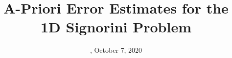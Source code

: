 

                    

\newcommand{\Rplus}{\protect\hspace{-.1em}\protect\raisebox{.35ex}{\smaller{\smaller\textbf{+}}}}
\newcommand{\Cpp}{\mbox{C\Rplus\Rplus}\xspace}
\newcommand{\CppTw}{\mbox{C\Rplus\Rplus 20}\xspace}

\newcommand{\Datum}{\today}

\renewcommand{\PraesentationFusszeileZusatz}{| A-Priori Error Estimates for the One-Dimensional Signorini Problem}

\title{A-Priori Error Estimates for the 1D Signorini Problem \newline {}}
\author{\PersonTitel{} \PersonVorname{} \PersonNachname}
\date[\Datum]{\PersonStadt, October 7, 2020}
\subject{Optimal-Order A-Priori Error Estimates for the One-Dimensional Signorini Problem}


 



\PraesentationMasterStandard

\PraesentationStartseiteUhrenturm
\PraesentationTitelseite %


